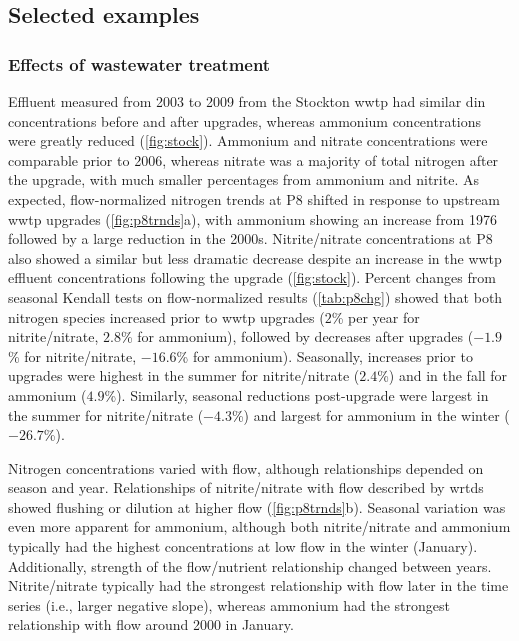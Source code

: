 \documentclass[letterpaper,12pt,oneside]{article}\usepackage[]{graphicx}\usepackage[]{color}
\begin{document}
\subsection{Selected examples}

\subsubsection{Effects of wastewater treatment}



Effluent measured from 2003 to 2009 from the Stockton \ac{wwtp} had similar \ac{din} concentrations before and after upgrades, whereas ammonium concentrations were greatly reduced (\cref{fig:stock}).  Ammonium and nitrate concentrations were comparable prior to 2006, whereas nitrate was a majority of total nitrogen after the upgrade, with much smaller percentages from ammonium and nitrite. As expected, flow-normalized nitrogen trends at P8 shifted in response to upstream \ac{wwtp} upgrades (\cref{fig:p8trnds}a), with ammonium showing an increase from 1976 followed by a large reduction in the 2000s.  Nitrite/nitrate concentrations at P8 also showed a similar but less dramatic decrease despite an increase in the \ac{wwtp} effluent concentrations following the upgrade (\cref{fig:stock}).  Percent changes from seasonal Kendall tests on flow-normalized results (\cref{tab:p8chg}) showed that both nitrogen species increased prior to \ac{wwtp} upgrades ($2$\% per year for nitrite/nitrate, $2.8$\% for ammonium), followed by decreases after upgrades ($-1.9$\% for nitrite/nitrate, $-16.6$\% for ammonium).  Seasonally, increases prior to upgrades were highest in the summer for nitrite/nitrate ($2.4$\%) and in the fall for ammonium ($4.9$\%). Similarly, seasonal reductions post-upgrade were largest in the summer for nitrite/nitrate ($-4.3$\%) and largest for ammonium in the winter ($-26.7$\%).

Nitrogen concentrations varied with flow, although relationships depended on season and year. Relationships of nitrite/nitrate with flow described by \ac{wrtds} showed flushing or dilution at higher flow (\cref{fig:p8trnds}b).  Seasonal variation was even more apparent for ammonium, although both nitrite/nitrate and ammonium typically had the highest concentrations at low flow in the winter (January).  Additionally, strength of the flow/nutrient relationship changed between years. Nitrite/nitrate typically had the strongest relationship with flow later in the time series (i.e., larger negative slope), whereas ammonium had the strongest relationship with flow around 2000 in January. 
\end{document}
